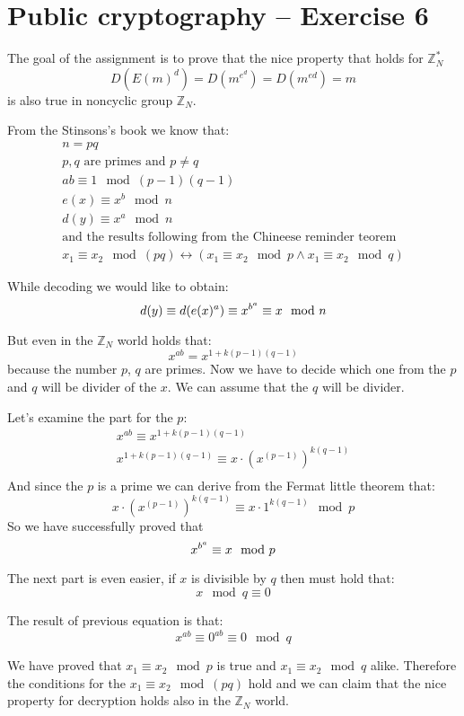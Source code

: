 \documentclass[a4paper,10pt]{article}
\begin{document}
\section*{Public cryptography -- Exercise 6}
The goal of the assignment is to prove that the nice property that holds for $\mathds{Z}^*_N$ 
$$
D(E(m)^d) = D(m^{e^d}) = D(m^{ed}) = m
$$
is also true in noncyclic group $\mathds{Z}_N$.

\noindent
From the Stinsons's book we know that:
$$
\begin{array}{c}
n = pq\\
p,q\text{ are primes and } p \neq q\\
ab \equiv 1 \mod (p-1)(q-1)\\
e(x) \equiv x^b \mod n\\
d(y) \equiv x^a \mod n\\
\text{and the results following from the Chineese reminder teorem}\\
x_1 \equiv x_2 \mod (pq) \leftrightarrow (x_1 \equiv x_2 \mod p \wedge x_1 \equiv x_2 \mod q)
\end{array}
$$

\noindent
While decoding we would like to obtain:
$$
d(y) \equiv d(e(x)^a) \equiv x^{b^a} \equiv x \mod n\\
$$

\noindent
But even in the $\mathds{Z}_N$ world holds that:
$$
x^{ab} = x^{1+k(p-1)(q-1)}
$$
because the number $p$, $q$ are primes. Now we have to decide which one from the $p$ and $q$ will be divider of the $x$. We can assume that the $q$ will be divider.

\noindent
Let's examine the part for the $p$:
$$
\begin{array}{c}
x^{ab} \equiv x^{1+k(p-1)(q-1)}\\
x^{1+k(p-1)(q-1)} \equiv x \cdot \left( x^{(p-1)} \right) ^{k(q-1)}\\
\end{array}
$$
And since the $p$ is a prime we can derive from the Fermat little theorem that:
$$
x \cdot \left( x^{(p-1)} \right) ^{k(q-1)} \equiv x \cdot 1^{k(q-1)} \mod p
$$
So we have successfully proved that 
$$
x^{b^a} \equiv x \mod p\\
$$

\noindent
The next part is even easier, if $x$ is divisible by $q$ then must hold that:
$$
x \mod q \equiv 0
$$

\noindent
The result of previous equation is that:
$$
x^{ab} \equiv 0^{ab} \equiv 0 \mod q
$$

\noindent
We have proved that $x_1 \equiv x_2 \mod p$ is true and $x_1 \equiv x_2 \mod q$ alike. Therefore the conditions for the $x_1 \equiv x_2 \mod (pq)$ hold and we can claim that the nice property for decryption holds also in the $\mathds{Z}_N$ world.
\end{document}
